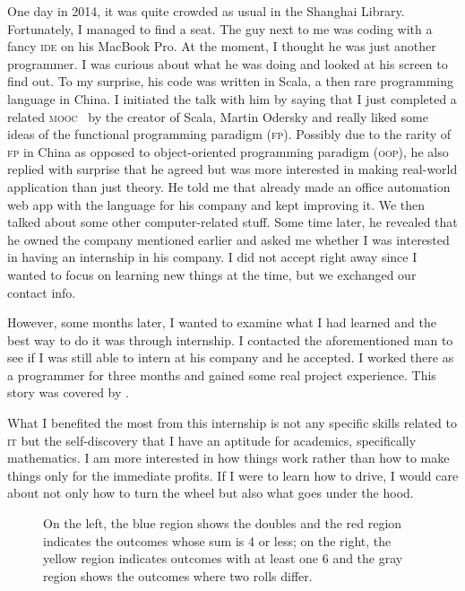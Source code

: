 	One day in 2014, it was quite crowded as usual in the Shanghai Library.
	Fortunately, I managed to find a seat. The guy next to me was coding with a
	fancy \textsc{ide} on his MacBook Pro. At the moment, I thought he was just
	another programmer. I was curious about what he was doing and looked at his
	screen to find out. To my surprise, his code was written in Scala, a then rare
	programming language in China. I initiated the talk with him by saying that I
	just completed a related \textsc{mooc}~\cite{FPPS} by the creator of Scala,
	Martin Odersky and really liked some ideas of the functional programming
	paradigm (\textsc{fp}). Possibly due to the rarity of \textsc{fp} in China as
	opposed to object-oriented programming paradigm (\textsc{oop}), he also replied
	with surprise that he agreed but was more interested in making real-world
	application than just theory. He told me that already made an office automation
	web app with the language for his company and kept improving it. We then talked
	about some other computer-related stuff. Some time later, he revealed that he
	owned the company mentioned earlier and asked me whether I was interested in
	having an internship in his company. I did not accept right away since I wanted
	to focus on learning new things at the time, but we exchanged our contact info.
	
	However, some months later, I wanted to examine what I had learned and the best
	way to do it was through internship. I contacted the aforementioned man to see
	if I was still able to intern at his company and he accepted. I worked there as
	a programmer for three months and gained some real project experience. This
	story was covered by .
	
	What I benefited the most from this internship is not any specific skills
	related to \textsc{it} but the self-discovery that I have an aptitude for
	academics, specifically mathematics. I am more interested in how things work
	rather than how to make things only for the immediate profits. If I were to
	learn how to drive, I would care about not only how to turn the wheel but also
	what goes under the hood.
	
	\begin{wrapfigure}[8]{r}[.6in]{.4\textwidth}
		\scalebox{.4}{ \lnum  }
		\caption{On the left, the blue region shows the doubles and the red region
			indicates the outcomes whose sum is 4 or less; on the right, the yellow region
			indicates outcomes with at least one 6 and the gray region shows the outcomes
			where two rolls differ.}
		\label{fig:CondProbEx}
	\end{wrapfigure}
	
